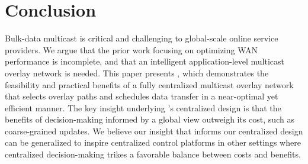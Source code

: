 \section{Conclusion}
Bulk-data multicast is critical and challenging to global-scale
online service providers. 
We argue that the prior work focusing on optimizing WAN performance
is incomplete, and that an intelligent application-level multicast 
overlay network is needed.
This paper presents \name, which demonstrates the feasibility 
and practical benefits of a fully centralized multicast overlay 
network that selects overlay paths and schedules data transfer in
a near-optimal yet efficient manner.
The key insight underlying \name's centralized design is that the 
benefits of decision-making informed by a global view
outweigh its cost, such as coarse-grained updates.
We believe our insight that informs our centralized design can be 
generalized to inspire centralized control platforms in other 
settings where centralized decision-making trikes a favorable 
balance between costs and benefits.